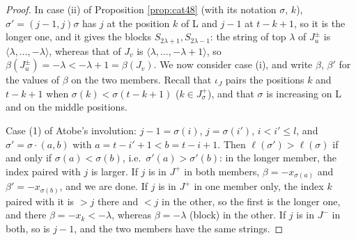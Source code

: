 \documentclass[a4paper,12pt,leqno]{amsart}
\theoremstyle{plain}
\theoremstyle{definition}
\begin{document}
\begin{proof}
In case (ii) of Proposition \ref{prop:cat48} (with its notation $\sigma$, $k$), $\sigma'=(j-1,j)\sigma$ has $j$
at the position $k$ of L
and $j-1$ at $t-k+1$, so it is the longer one, and it gives the blocks $S_{2\lambda+1},S_{2\lambda-1}$: the
string of top $\lambda$ of $J_u^\pm$ is $\langle\lambda,\ldots,-\lambda\rangle$, whereas that of $J_v$ is
$\langle\lambda,\ldots,-\lambda+1\rangle$, so $\beta(J_u^\pm)=-\lambda<-\lambda+1=\beta(J_v)$. We now consider
case (i), and write $\beta$, $\beta'$ for the values of $\beta$ on the two members. Recall that $\iota_J$ pairs
the positions $k$ and $t-k+1$ when $\sigma(k)<\sigma(t-k+1)$ ($k\in J^+_\sigma$), and that $\sigma$ is
increasing on L and on the middle positions.

Case (1) of Atobe's involution: $j-1=\sigma(i)$, $j=\sigma(i')$, $i<i'\leq l$, and
$\sigma'=\sigma\cdot(a,b)$ with $a=t-i'+1<b=t-i+1$. Then $\ell(\sigma')>\ell(\sigma)$ if and only if
$\sigma(a)<\sigma(b)$, i.e.\ $\sigma'(a)>\sigma'(b)$: in the longer member, the index paired with $j$ is
larger. If $j$ is in $J^+$ in both members, $\beta=-x_{\sigma(a)}$ and $\beta'=-x_{\sigma(b)}$, and
we are done. If $j$ is in $J^+$ in one member only, the index $k$ paired with it is $>j$ there and $<j$ in the other,
so the first is the longer one, and there $\beta=-x_k<-\lambda$, whereas $\beta=-\lambda$
(block) in the other. If $j$ is in $J^-$ in both, so is $j-1$, and the two members have the same
strings.


\end{proof}
\end{document}
